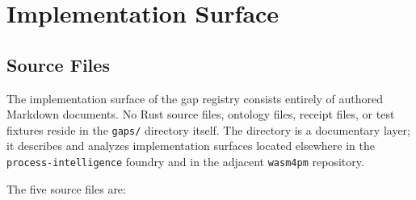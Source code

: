 
\section{Implementation Surface}
\label{sec:gaps-implementation}

\subsection{Source Files}
\label{sec:gaps-implementation-source}

The implementation surface of the gap registry consists entirely of authored Markdown
documents. No Rust source files, ontology files, receipt files, or test fixtures reside
in the \texttt{gaps/} directory itself. The directory is a documentary layer; it
describes and analyzes implementation surfaces located elsewhere in the
\texttt{process-intelligence} foundry and in the adjacent \texttt{wasm4pm} repository.

The five source files are:


